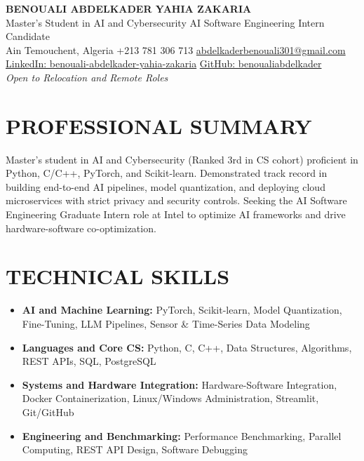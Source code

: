\documentclass[10pt,letterpaper]{article}
\begin{document}
\begin{center}
    {\Large \textbf{BENOUALI ABDELKADER YAHIA ZAKARIA}}\\[1pt]
    \small Master's Student in AI and Cybersecurity \quad\textbullet\quad AI Software Engineering Intern Candidate\\[1pt]
    Ain Temouchent, Algeria \quad\textbullet\quad +213 781 306 713 \quad\textbullet\quad \href{mailto:abdelkaderbenouali301@gmail.com}{abdelkaderbenouali301@gmail.com}\\
    \href{https://www.linkedin.com/in/benouali-abdelkader-yahia-zakaria-4a917a247}{LinkedIn: benouali-abdelkader-yahia-zakaria} \quad\textbullet\quad \href{https://github.com/benoualiabdelkader}{GitHub: benoualiabdelkader}\\
    \small \textit{Open to Relocation and Remote Roles}
\end{center}

\vspace{-8pt}

\section*{PROFESSIONAL SUMMARY}
Master's student in AI and Cybersecurity (Ranked 3rd in CS cohort) proficient in Python, C/C++, PyTorch, and Scikit-learn. Demonstrated track record in building end-to-end AI pipelines, model quantization, and deploying cloud microservices with strict privacy and security controls. Seeking the AI Software Engineering Graduate Intern role at Intel to optimize AI frameworks and drive hardware-software co-optimization.

\section*{TECHNICAL SKILLS}
\begin{itemize}
    \item \textbf{AI and Machine Learning:} PyTorch, Scikit-learn, Model Quantization, Fine-Tuning, LLM Pipelines, Sensor \& Time-Series Data Modeling
    \item \textbf{Languages and Core CS:} Python, C, C++, Data Structures, Algorithms, REST APIs, SQL, PostgreSQL
    \item \textbf{Systems and Hardware Integration:} Hardware-Software Integration, Docker Containerization, Linux/Windows Administration, Streamlit, Git/GitHub
    \item \textbf{Engineering and Benchmarking:} Performance Benchmarking, Parallel Computing, REST API Design, Software Debugging
\end{itemize}
\end{document}
